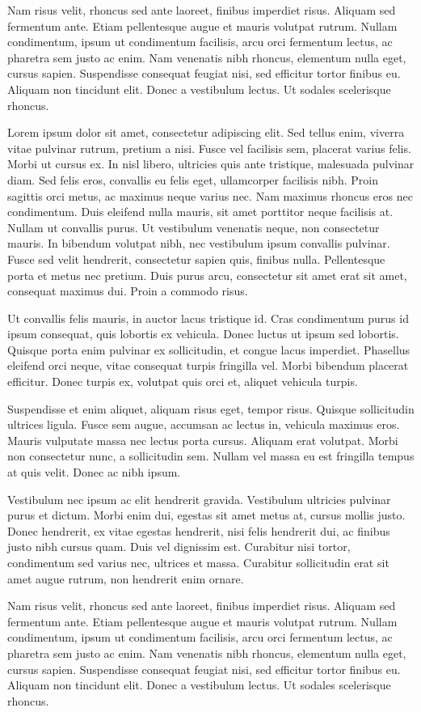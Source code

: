 Nam risus velit, rhoncus sed ante laoreet, finibus imperdiet risus. Aliquam sed fermentum ante. Etiam pellentesque augue et mauris volutpat rutrum. Nullam condimentum, ipsum ut condimentum facilisis, arcu orci fermentum lectus, ac pharetra sem justo ac enim. Nam venenatis nibh rhoncus, elementum nulla eget, cursus sapien. Suspendisse consequat feugiat nisi, sed efficitur tortor finibus eu. Aliquam non tincidunt elit. Donec a vestibulum lectus. Ut sodales scelerisque rhoncus. 



Lorem ipsum dolor sit amet, consectetur adipiscing elit. Sed tellus enim, viverra vitae pulvinar rutrum, pretium a nisi. Fusce vel facilisis sem, placerat varius felis. Morbi ut cursus ex. In nisl libero, ultricies quis ante tristique, malesuada pulvinar diam. Sed felis eros, convallis eu felis eget, ullamcorper facilisis nibh. Proin sagittis orci metus, ac maximus neque varius nec. Nam maximus rhoncus eros nec condimentum. Duis eleifend nulla mauris, sit amet porttitor neque facilisis at. Nullam ut convallis purus. Ut vestibulum venenatis neque, non consectetur mauris. In bibendum volutpat nibh, nec vestibulum ipsum convallis pulvinar. Fusce sed velit hendrerit, consectetur sapien quis, finibus nulla. Pellentesque porta et metus nec pretium. Duis purus arcu, consectetur sit amet erat sit amet, consequat maximus dui. Proin a commodo risus.

Ut convallis felis mauris, in auctor lacus tristique id. Cras condimentum purus id ipsum consequat, quis lobortis ex vehicula. Donec luctus ut ipsum sed lobortis. Quisque porta enim pulvinar ex sollicitudin, et congue lacus imperdiet. Phasellus eleifend orci neque, vitae consequat turpis fringilla vel. Morbi bibendum placerat efficitur. Donec turpis ex, volutpat quis orci et, aliquet vehicula turpis.

Suspendisse et enim aliquet, aliquam risus eget, tempor risus. Quisque sollicitudin ultrices ligula. Fusce sem augue, accumsan ac lectus in, vehicula maximus eros. Mauris vulputate massa nec lectus porta cursus. Aliquam erat volutpat. Morbi non consectetur nunc, a sollicitudin sem. Nullam vel massa eu est fringilla tempus at quis velit. Donec ac nibh ipsum.

Vestibulum nec ipsum ac elit hendrerit gravida. Vestibulum ultricies pulvinar purus et dictum. Morbi enim dui, egestas sit amet metus at, cursus mollis justo. Donec hendrerit, ex vitae egestas hendrerit, nisi felis hendrerit dui, ac finibus justo nibh cursus quam. Duis vel dignissim est. Curabitur nisi tortor, condimentum sed varius nec, ultrices et massa. Curabitur sollicitudin erat sit amet augue rutrum, non hendrerit enim ornare.

Nam risus velit, rhoncus sed ante laoreet, finibus imperdiet risus. Aliquam sed fermentum ante. Etiam pellentesque augue et mauris volutpat rutrum. Nullam condimentum, ipsum ut condimentum facilisis, arcu orci fermentum lectus, ac pharetra sem justo ac enim. Nam venenatis nibh rhoncus, elementum nulla eget, cursus sapien. Suspendisse consequat feugiat nisi, sed efficitur tortor finibus eu. Aliquam non tincidunt elit. Donec a vestibulum lectus. Ut sodales scelerisque rhoncus. 

\bye 
